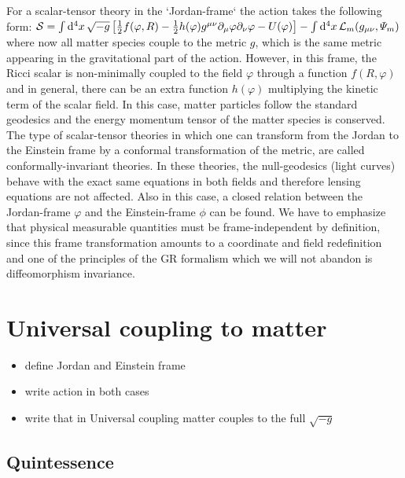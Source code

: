 For a scalar-tensor theory in the `Jordan-frame` the action takes the following form:
\beeqc$\label{eq:einstein-frame-action}
\mathcal{S} = \int \mathrm{d}^{4} {x} \, \sqrt{-g} \left[  \frac{1}{2} f(\varphi, R) - \frac{1}{2} h(\varphi) g^{\mu \nu}  \partial_{\mu}\varphi \partial_{\nu}\varphi 
- U(\varphi)    \right] - \int \mathrm{d}^{4} {x} \, \mathcal{L}_m (g_{\mu \nu} , \varPsi_m )
$
where now all matter species couple to the metric $g$, which is the same metric appearing in the gravitational part of the action.
However, in this frame, the Ricci scalar is non-minimally coupled to the field $\varphi$ through a function $f(R, \varphi)$ and in general, there can be an extra function $h(\varphi)$ multiplying the kinetic term of the scalar field.
In this case, matter particles follow the standard geodesics and the energy momentum tensor of the matter species is conserved.
The type of scalar-tensor theories in which 
one can transform from the Jordan to the Einstein frame by a conformal transformation
of the metric, are called conformally-invariant theories. 
In these theories, the null-geodesics (light curves) behave with the exact same equations in both fields and therefore
lensing equations are not affected.
Also in this case, a closed relation between the Jordan-frame $\varphi$ and the 
Einstein-frame $\phi$ can be found.
We have to emphasize that physical measurable quantities must be frame-independent by definition,
since this frame transformation amounts to a coordinate and field redefinition and one of 
the principles of the GR formalism which we will not abandon is diffeomorphism invariance.


\section{Universal coupling to matter}

\begin{itemize}
\item define Jordan and Einstein frame 
\item write action in both cases
\item write that in Universal coupling matter couples to the full $\sqrt{-g}$
\end{itemize}

\subsection{Quintessence}

